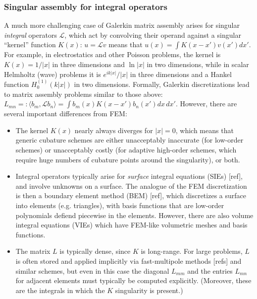 \subsubsection{Singular assembly for integral operators}

A much more challenging case of Galerkin matrix assembly arises for
singular \emph{integral} operators $\mathcal{L}$, which act by
convolving their operand against a singular ``kernel'' function
$K(x)$: $u = \mathcal{L} v$ means that $u(x) = \int K(x - x') v(x')
dx'$.  For example, in electrostatics and other Poisson problems, the
kernel is $K(x) = 1/|x|$ in three dimensions and $\ln |x|$ in two
dimensions, while in scalar Helmholtz (wave) problems it is
$e^{ik|x|}/|x|$ in three dimensions and a Hankel function
$H^{(1)}_0(k|x|)$ in two dimensions.  Formally, Galerkin
discretizations lead to matrix assembly problems similar to those
above: $L_{mn} =: \langle b_m, \mathcal{L} b_n \rangle = \int b_m(x)
K(x - x') b_n(x') dx\,dx'$.  However, there are several important
differences from FEM:

\begin{itemize}

\item The kernel $K(x)$ nearly always diverges for $|x|=0$, which means that generic cubature schemes are either unacceptably inaccurate (for low-order schemes) or unacceptably costly (for adaptive high-order schemes, which require huge numbers of cubature points around the singularity), or both.

\item Integral operators typically arise for \emph{surface} integral
  equations (SIEs) [ref], and involve unknowns on a surface.  The
  analogue of the FEM discretization is then a boundary element method
  (BEM) [ref], which discretizes a surface into elements
  (e.g. triangles), with basis functions that are low-order
  polynomials defiend piecewise in the elements.  However, there are
  also volume integral equations (VIEs) which have FEM-like volumetric
  meshes and basis functions.

\item The matrix $L$ is typically dense, since $K$ is long-range.  For
  large problems, $L$ is often stored and applied implicitly via
  fast-multipole methods [refs] and similar schemes, but even in this
  case the diagonal $L_{mm}$ and the entries $L_{mn}$ for adjacent
  elements must typically be computed explicitly.  (Moreover, these
  are the integrals in which the $K$ singularity is present.)

\end{itemize}


